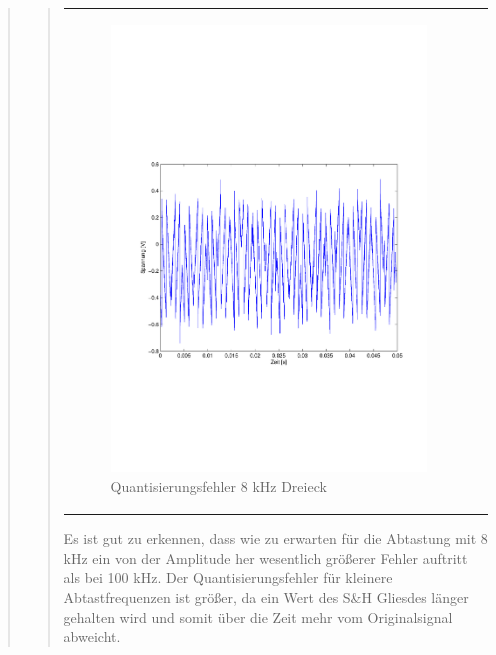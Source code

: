 \begin{quote}
\begin{quote}
\begin{center}
\begin{tabular}{ll}
                \begin{minipage}{0.6\textwidth}
                    \begin{figure}[H]
                        \includegraphics[scale=0.5, trim = 16mm 70mm 16mm 85mm, clip]
                                        {Bilder/8kHz_dreieck_Quantisierungsfehler}
                        \caption{Quantisierungsfehler 8 kHz Dreieck}
                        \label{fig:QuantErr 8 kHz Dreieck}
                    \end{figure}
                \end{minipage}
            
            \end{tabular}
        \end{center}
        \vspace{2em}
        
        Es ist gut zu erkennen, dass wie zu erwarten für die Abtastung mit 8 kHz ein von der Amplitude her wesentlich
        größerer Fehler auftritt als bei 100 kHz. Der Quantisierungsfehler für kleinere Abtastfrequenzen ist größer, da
        ein Wert des S\&H Gliesdes länger gehalten wird und somit über die Zeit mehr vom Originalsignal abweicht.
        

\end{quote}
\end{quote}
